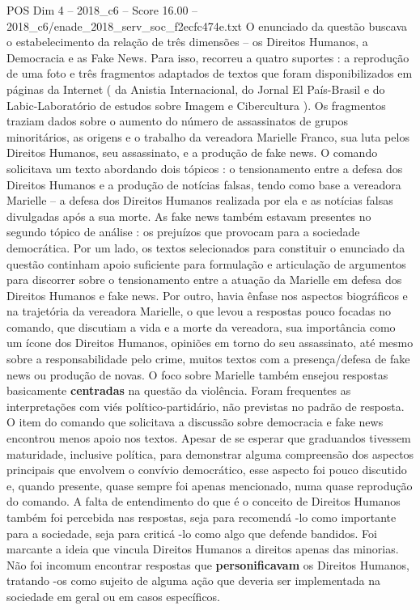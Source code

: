 \begin{textsample}{POS Dim 4 – 2018\_c6 – Score 16.00 – 2018\_c6/enade\_2018\_serv\_soc\_f2ecfc474e.txt}
O enunciado da questão buscava o estabelecimento da relação de três dimensões – os Direitos Humanos, a Democracia e as Fake News.
Para isso, recorreu a quatro suportes : a reprodução de uma foto e três fragmentos adaptados de textos que foram disponibilizados em páginas da Internet ( da Anistia Internacional, do Jornal El País-Brasil e do Labic-Laboratório de estudos sobre Imagem e Cibercultura ).
Os fragmentos traziam dados sobre o aumento do número de assassinatos de grupos minoritários, as origens e o trabalho da vereadora Marielle Franco, sua luta pelos Direitos Humanos, seu assassinato, e a produção de fake news.
O comando solicitava um texto abordando dois tópicos : o tensionamento entre a defesa dos Direitos Humanos e a produção de notícias falsas, tendo como base a vereadora Marielle – a defesa dos Direitos Humanos realizada por ela e as notícias falsas divulgadas após a sua morte.
As fake news também estavam presentes no segundo tópico de análise : os prejuízos que provocam para a sociedade democrática.
Por um lado, os textos selecionados para constituir o enunciado da questão continham apoio suficiente para formulação e articulação de argumentos para discorrer sobre o tensionamento entre a atuação da Marielle em defesa dos Direitos Humanos e fake news.
Por outro, havia ênfase nos aspectos biográficos e na trajetória da vereadora Marielle, o que levou a respostas pouco focadas no comando, que discutiam a vida e a morte da vereadora, sua importância como um ícone dos Direitos Humanos, opiniões em torno do seu assassinato, até mesmo sobre a responsabilidade pelo crime, muitos textos com a presença/defesa de fake news ou produção de novas.
O foco sobre Marielle também ensejou respostas basicamente \textbf{centradas} na questão da violência.
Foram frequentes as interpretações com viés político-partidário, não previstas no padrão de resposta.
O item do comando que solicitava a discussão sobre democracia e fake news encontrou menos apoio nos textos.
Apesar de se esperar que graduandos tivessem maturidade, inclusive política, para demonstrar alguma compreensão dos aspectos principais que envolvem o convívio democrático, esse aspecto foi pouco discutido e, quando presente, quase sempre foi apenas mencionado, numa quase reprodução do comando.
A falta de entendimento do que é o conceito de Direitos Humanos também foi percebida nas respostas, seja para recomendá -lo como importante para a sociedade, seja para criticá -lo como algo que defende bandidos.
Foi marcante a ideia que vincula Direitos Humanos a direitos apenas das minorias.
Não foi incomum encontrar respostas que \textbf{personificavam} os Direitos Humanos, tratando -os como sujeito de alguma ação que deveria ser implementada na sociedade em geral ou em casos específicos.

\end{textsample}
